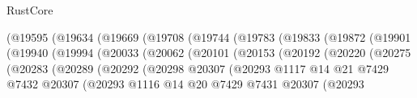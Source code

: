 \begin{lexlean}{RustCore}
\begin{coremodule}
                              (@19595
                                (@19634
                                  (@19669
                                    (@19708
                                      (@19744
                                        (@19783
                                          (@19833
                                            (@19872
                                              (@19901
                                                (@19940
                                                  (@19994
                                                    (@20033
                                                      (@20062
                                                        (@20101
                                                          (@20153
                                                            (@20192
                                                              (@20220
                                                                (@20275
                                                                  (@20283
                                                                    (@20289
                                                                      (@20292
                                                                        (@20298
                                                                          @20307
                                                                          (@20293
                                                                            @1117
                                                                            @14
                                                                            @21
                                                                            @7429
                                                                            @7432
                                                                            @20307
                                                                            (@20293
                                                                              @1116
                                                                              @14
                                                                              @20
                                                                              @7429
                                                                              @7431
                                                                              @20307
                                                                              (@20293

\end{coremodule}
\end{lexlean}
